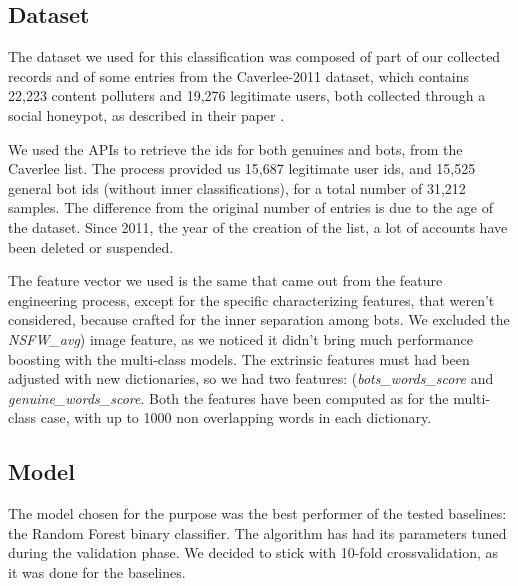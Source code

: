 \subsection{Dataset}
The dataset we used for this classification was composed of part of our collected records and of some entries from the Caverlee-2011 dataset, which contains 22,223 content polluters and 19,276 legitimate users, both collected through a social honeypot, as described in their paper \cite{Lee11sevenmonths}.

We used the APIs to retrieve the ids for both genuines and bots, from the Caverlee list. The process provided us 15,687 legitimate user ids, and 15,525 general bot ids (without inner classifications), for a total number of 31,212 samples.
The difference from the original number of entries is due to the age of the dataset. Since 2011, the year of the creation of the list, a lot of accounts have been deleted or suspended.

The feature vector we used is the same that came out from the feature engineering process, except for the specific characterizing features, that weren't considered, because crafted for the inner separation among bots. We excluded the \textit{NSFW\_avg}) image feature, as we noticed it didn't bring much performance boosting with the multi-class models.
The extrinsic features must had been adjusted with new dictionaries, so we had two features: (\textit{bots\_words\_score} and  \textit{genuine\_words\_score}.
Both the features have been computed as for the multi-class case, with up to 1000 non overlapping words in each dictionary.

\subsection{Model}
The model chosen for the purpose was the best performer of the tested baselines: the Random Forest binary classifier.
The algorithm has had its parameters tuned during the validation phase.
We decided to stick with 10-fold crossvalidation, as it was done for the baselines.

